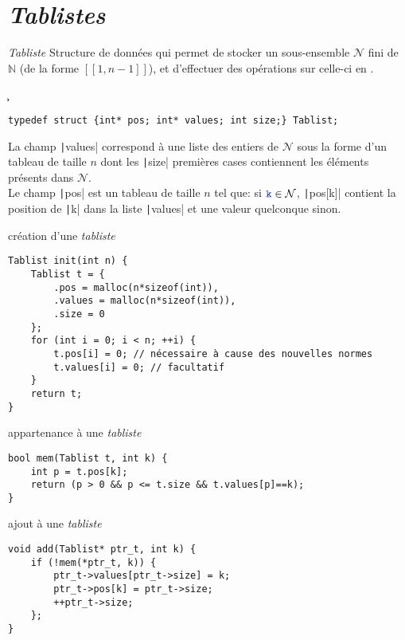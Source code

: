 \section{\emph{Tablistes}}
\begin{df*}{\emph{Tabliste}}
Structure de données qui permet de stocker un sous-ensemble $\mathcal{N}$ fini de $\mathbb{N}$ (de la forme $\left[\!\left[1,n-1\right]\!\right]$), et d'effectuer des opérations sur celle-ci en .
\end{df*}
\c
\begin{tp*}{}
\begin{verbatim}
typedef struct {int* pos; int* values; int size;} Tablist;
\end{verbatim}
La champ \texttt|values| correspond à une liste des entiers de $\mathcal{N}$ sous la forme d'un tableau de taille $n$ dont les \texttt|size| premières cases contiennent les éléments présents dans $\mathcal{N}$.\\Le champ \texttt|pos| est un tableau de taille $n$ tel que: si $\vr{k}\in\mathcal{N}$, \texttt|pos[k]| contient la position de \texttt|k| dans la liste \texttt|values| et une valeur quelconque sinon.
\end{tp*}
\begin{fnc*}{création d'une \emph{tabliste}}
\begin{verbatim}
Tablist init(int n) {
    Tablist t = {
        .pos = malloc(n*sizeof(int)),
        .values = malloc(n*sizeof(int)),
        .size = 0
    };
    for (int i = 0; i < n; ++i) {
        t.pos[i] = 0; // nécessaire à cause des nouvelles normes
        t.values[i] = 0; // facultatif
    }
    return t;
}
\end{verbatim}
\end{fnc*}
\begin{fnc*}{appartenance à une \emph{tabliste}}
\begin{verbatim}
bool mem(Tablist t, int k) {
    int p = t.pos[k];
    return (p > 0 && p <= t.size && t.values[p]==k);
}
\end{verbatim}
\end{fnc*}
\begin{fnc*}{ajout à une \emph{tabliste}}
\begin{verbatim}
void add(Tablist* ptr_t, int k) {
    if (!mem(*ptr_t, k)) {
        ptr_t->values[ptr_t->size] = k;
        ptr_t->pos[k] = ptr_t->size;
        ++ptr_t->size;
    };
}
\end{verbatim}
\end{fnc*}
